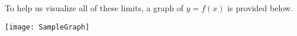 \begin{enumerate}
To help us visualize all of these limits, a graph of $y = f(x)$ is provided below.

\begin{center}\texttt{[image: SampleGraph]}\end{center}

\end{enumerate}



